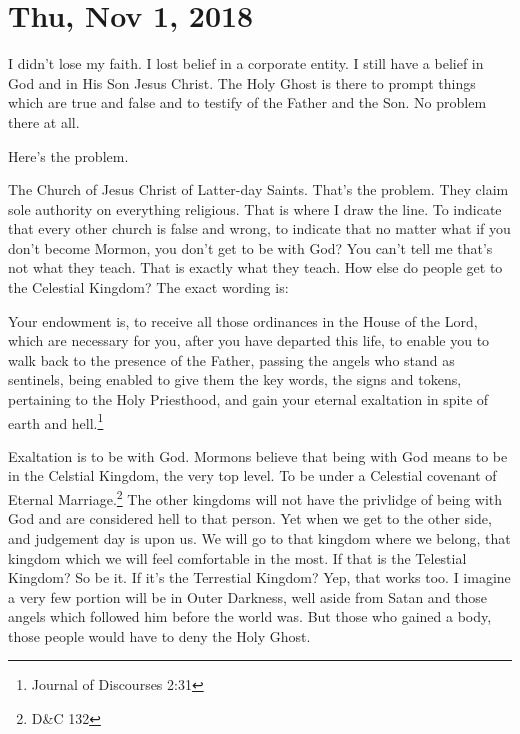 \section{Thu, Nov 1, 2018}

I didn't lose my faith. I lost belief in a corporate entity. I still have a belief in
God and in His Son Jesus Christ. The Holy Ghost is there to prompt things which are
true and false and to testify of the Father and the Son. No problem there at all.

Here's the problem.

The Church of Jesus Christ of Latter-day Saints. That's the problem. They claim sole
authority on everything religious. That is where I draw the line. To indicate that
every other church is false and wrong, to indicate that no matter what if you don't
become Mormon, you don't get to be with God? You can't tell me that's not what they
teach. That is exactly what they teach. How else do people get to the Celestial
Kingdom? The exact wording is:

\begin{displayquote}
Your endowment is, to receive all those ordinances in the House of the
Lord, which are necessary for you, after you have departed this life, to enable you 
to walk back to the presence of the Father, passing the angels who stand as 
sentinels, being enabled to give them the key words, the signs and tokens, 
pertaining to the Holy Priesthood, and gain your eternal exaltation in spite of 
earth and hell.\footnote{Journal of Discourses 2:31}
\end{displayquote}

Exaltation is to be with God. Mormons believe that being with God means to be in the
Celstial Kingdom, the very top level. To be under a Celestial covenant of Eternal
Marriage.\footnote{D\&C 132} The other kingdoms will not have the privlidge of being
with God and are considered hell to that person. Yet when we get to the other side,
and judgement day is upon us. We will go to that kingdom where we belong, that
kingdom which we will feel comfortable in the most. If that is the Telestial Kingdom?
So be it. If it's the Terrestial Kingdom? Yep, that works too. I imagine a very few
portion will be in Outer Darkness, well aside from Satan and those angels which
followed him before the world was. But those who gained a body, those people would
have to deny the Holy Ghost.

